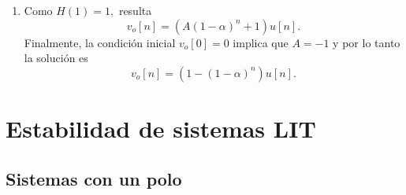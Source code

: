 \begin{enumerate}
\item Como $H\left( 1\right) =1,$ resulta 
\begin{equation}
  v_o\left[ n\right] =\left( A\left( 1-\alpha \right) ^n+1\right) u\left[ n\right] .
\end{equation}
Finalmente, la condici\'{o}n inicial $v_o\left[ 0\right] =0$ implica que 
$A=-1$ y por lo tanto la soluci\'{o}n es 
\begin{equation}
  v_o\left[ n\right] =\left( 1-\left( 1-\alpha \right) ^n\right) u\left[ n\right] .
\end{equation}

\end{enumerate}

\section{Estabilidad de sistemas LIT}

\subsection{Sistemas con un polo}

